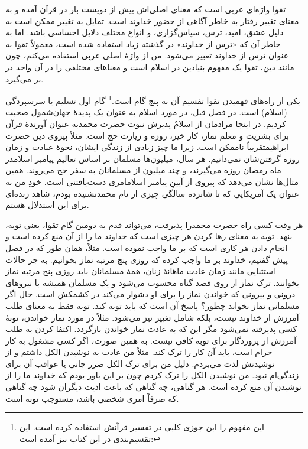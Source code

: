 تقوا واژه‌ای عربی است که معنای اصلی‌اش بیش از دویست بار در قرآن آمده و به معنای تغییر رفتار به خاطر آگاهی از حضور خداوند است. تمایل به تغییر ممکن است به دلیل عشق، امید، ترس، سپاس‌گزاری، و انواع مختلف دلایل احساسی باشد. اما به خاطر آن که «ترس از خداوند» در گذشته زیاد استفاده شده است، معمولاً تقوا به عنوان ترس از خداوند تعبیر می‌شود. من از واژهٔ اصلی عربی استفاده می‌کنم، چون مانند دین، تقوا یک مفهوم بنیادین در اسلام است و معناهای مختلفی را در آن واحد در بر می‌گیرد.

یکی از راه‌های فهمیدن تقوا تقسیم آن به پنج گام است.\footnote{این مفهوم را ابن جوزی کلبی در تفسیر قرآنش استفاده کرده است. این تقسیم‌بندی در این کتاب نیز آمده است:
	
	}
گام اول تسلیم یا سرسپردگی (اسلام) است. در فصل قبل، در مورد اسلام به عنوان یک پدیدهٔ جهان‌شمول صحبت کردیم. در اینجا مرادمان از اسلامْ پذیرش نبوت حضرت محمد{}به عنوان آورندهٔ قرآن برای بشریت و معلم نماز، کار خیر، روزه و زیارت حج است. مثلاً پیروی دین حضرت ابراهیم{}تقریباً ناممکن است. زیرا ما چیز زیادی از زندگی ایشان، نحوهٔ عبادت و زمان روزه گرفتن‌شان نمی‌دانیم. هر سال، میلیون‌ها مسلمان بر اساس تعالیم پیامبر اسلام{}در ماه رمضان روزه می‌گیرند، و چند میلیون از مسلمانان به سفر حج می‌روند. همین مثال‌ها نشان می‌دهد که پیروی از آیینِ پیامبر اسلام{}امری دست‌یافتنی است. خودِ من به عنوان یک آمریکایی که تا شانزده سالگی چیزی از نام محمد{}نشنیده بودم، شاهد زنده‌ای برای این استدلال هستم.

هر وقت کسی راه حضرت محمد{}را پذیرفت، می‌تواند قدم به دومین گام تقوا، یعنی توبه، بنهد. توبه به معنای رها کردن هر چیزی است که خداوند ما را از آن منع کرده است و انجام دادن هر کاری است که بر ما واجب نموده است. مثلاً، همان طور که در فصل پیش گفتیم، خداوند بر ما واجب کرده که روزی پنج مرتبه نماز بخوانیم. به جز حالات استثنایی مانند زمان عادت ماهانهٔ زنان، همهٔ مسلمانان باید روزی پنج مرتبه نماز بخوانند. ترک نماز از روی قصد گناه محسوب می‌شود و یک مسلمان همیشه با نیروهای درونی و بیرونی که خواندن نماز را برای او دشوار می‌کند در کشمکش است. حال اگر مسلمانی نماز نخواند چطور؟ پاسخ آن است که باید توبه کند. توبه فقط به معنای طلب آمرزش از خداوند نیست، بلکه شامل تغییر نیز می‌شود. مثلاً در مورد نماز خواندن، توبهٔ کسی پذیرفته نمی‌شود مگر این که به عادت نماز خواندن بازگردد. اکتفا کردن به طلب آمرزش از پروردگار برای توبه کافی نیست. به همین صورت، اگر کسی مشغول به کار حرام است، باید آن کار را ترک کند. مثلاً من عادت به نوشیدن الکل داشتم و از نوشیدنش لذت می‌بردم. دلیل من برای ترک الکل ضرر جانی یا عواقب آن برای زندگی‌ام نبود. من نوشیدن الکل را ترک کردم چون بر این باور بودم که خداوند ما را از نوشیدن آن منع کرده است. هر گناهی، چه گناهی که باعث اذیت دیگران شود چه گناهی که صرفاً امری شخصی باشد، مستوجب توبه است.

